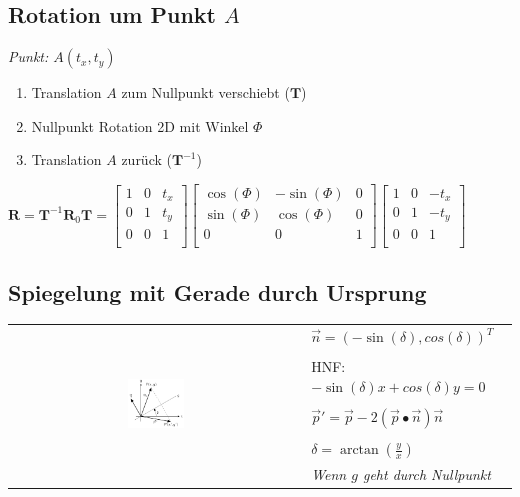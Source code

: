 \subsection{Rotation um Punkt $A$}

\textit{Punkt: $A(t_x, t_y)$}

\begin{enumerate}
    \item Translation $A$ zum Nullpunkt verschiebt ($\mathbf{T}$)
    \item Nullpunkt Rotation 2D mit Winkel $\Phi$
    \item Translation $A$ zurück ($\mathbf{T}^{-1}$)
\end{enumerate}

$\mathbf{R} = \mathbf{T}^{-1} \mathbf{R}_0 \mathbf{T} = \begin{bmatrix}
    1 & 0 & t_x \\
    0 & 1 & t_y \\
    0 & 0 & 1 \\
\end{bmatrix} \begin{bmatrix}
    \cos(\Phi) & -\sin(\Phi) & 0 \\
    \sin(\Phi) & \cos(\Phi) & 0 \\
    0 & 0 & 1 \\
\end{bmatrix} \begin{bmatrix}
    1 & 0 & -t_x \\
    0 & 1 & -t_y \\
    0 & 0 & 1 \\
\end{bmatrix}$

\subsection{Spiegelung mit Gerade durch Ursprung}

\begin{tabular}{cl}
    \multirow{8}{*}{
        \includegraphics[width=0.2\textwidth]{assets/mirror-on-line.png}
    } & $\vec{n} = (-\sin(\delta), cos(\delta))^T$ \\
    & \\
    & HNF: $-\sin(\delta)x + cos(\delta)y = 0$\\
    & \\
    & $\vec{p}' = \vec{p} - 2 (\vec{p} \bullet \vec{n}) \vec{n}$\\
    & \\
    & $\delta = \arctan(\frac{y}{x})$ \\
    & \textit{Wenn $g$ geht durch Nullpunkt}\\
\end{tabular}

